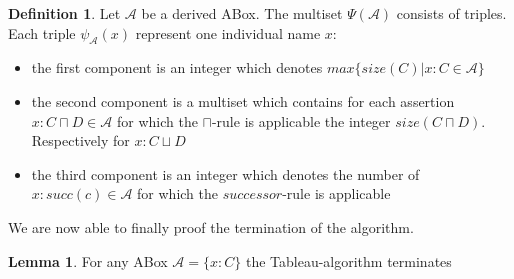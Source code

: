 \documentclass{book}
\theoremstyle{break}
\theoremstyle{definition}
\newtheorem{mydef}{Definition}
\newtheorem{mylem}{Lemma}
\begin{document}
\begin{mydef}
Let $\mathcal{A}$ be a derived ABox. The multiset $\Psi(\mathcal{A})$ consists of triples. Each triple $\psi_\mathcal{A}(x)$ represent one individual name $x$:
\begin{itemize}
\item the first component is an integer which denotes $max\{size(C)|x:C\in\mathcal{A}\}$
\item the second component is a multiset which contains for each assertion $x:C\sqcap D\in\mathcal{A}$ for which the $\sqcap$-rule is applicable the integer $size(C\sqcap D)$. Respectively for $x:C\sqcup D$
\item the third component is an integer which denotes the number of $x:succ(c)\in\mathcal{A}$ for which the $successor$-rule is applicable
\end{itemize}
\end{mydef}
We are now able to finally proof the termination of the algorithm.
\begin{mylem}
For any ABox $\mathcal{A}=\{x:C\}$ the Tableau-algorithm terminates
\end{mylem}
\end{document}

